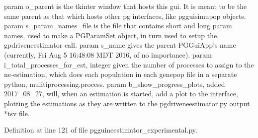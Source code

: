 \begin{DoxyVerb}param o_parent is the tkinter window that hosts this gui.  
    It is meant to be the same parent as that 
    which hosts other pg interfaces, like pgguisimupop objects.
param s_param_names_file is the file that contains short and long 
    param names, used to make a PGParamSet object, in turn used to 
    setup the gpdriveneestimator call.
param s_name gives the parent PGGuiApp's name 
    (currently, Fri Aug  5 16:48:08 MDT 2016, of no importance).
param i_total_processes_for_est, integer given the number of processes 
    to assign to the ne-estimation, which does each population 
    in each genepop file in a separate python, mulitiprocessing.process.
param b_show_progress_plots, added 2017_08_27, will, when an estimation
is started, add a plot to the interface, plotting the estimations as they
are written to the pgdriveneestimator.py output *tsv file.
\end{DoxyVerb}
 

Definition at line 121 of file pgguineestimator\+\_\+experimental.\+py.


